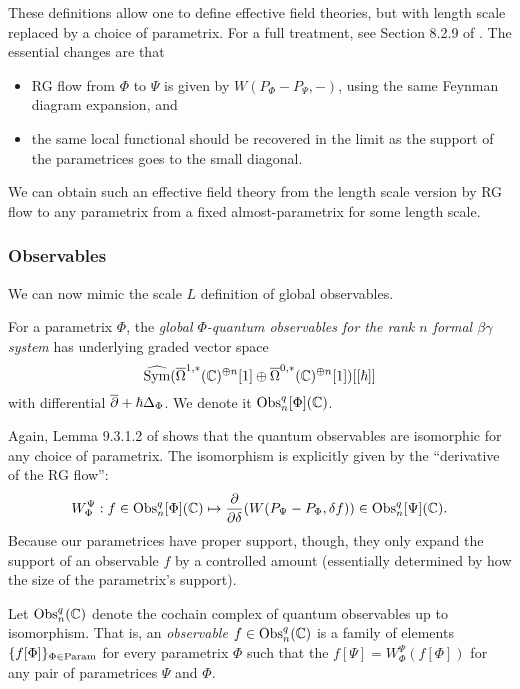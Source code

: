 These definitions allow one to define effective field theories, but with length scale replaced by a choice of parametrix.
For a full treatment, see Section 8.2.9 of \cite{CG}.
The essential changes are that 
\begin{itemize}
\item RG flow from $\Phi$ to $\Psi$ is given by $W(P_\Phi - P_\Psi,-)$, using the same Feynman diagram expansion, and
\item the same local functional should be recovered in the limit as the support of the parametrices goes to the small diagonal.
\end{itemize} 
We can obtain such an effective field theory from the length scale version 
by RG flow to any parametrix from a fixed almost-parametrix for some length scale.

\subsubsection{Observables}

We can now mimic the scale $L$ definition of global observables.

\begin{dfn}
For a parametrix $\Phi$, the  \emph{global $\Phi$-quantum observables for the rank $n$ formal $\beta\gamma$ system} has
underlying graded vector space
\[
\widehat{{\rm Sym}}(\overline{\Omega}^{1,*}(\mathbb C)^{\oplus n}[1] \oplus \overline{\Omega}^{0,*}(\mathbb C)^{\oplus n}[1])[[\hbar]]
\]
with differential $\overline{\partial} + \hbar \Delta_\Phi$. 
We denote it ${\rm Obs}^q_n[\Phi](\mathbb C)$.
\end{dfn}

Again, Lemma 9.3.1.2 of \cite{CG} shows that the quantum observables are isomorphic for any choice of parametrix.
The isomorphism is explicitly given by the ``derivative of the RG flow'':
\[
W_\Phi^\Psi: f \in {\rm Obs}^q_n[\Phi](\mathbb C) \mapsto \frac{\partial}{\partial \delta}(W(P_\Psi - P_\Phi, \delta f)) \in {\rm Obs}^q_n[\Psi](\mathbb C).
\]
Because our parametrices have proper support, though, they only expand the support of an observable $f$ by a controlled amount 
(essentially determined by how the size of the parametrix's support).

\begin{dfn}
Let ${\rm Obs}^q_n(\mathbb C)$ denote the cochain complex of quantum observables up to isomorphism.
That is, an \emph{observable} $f \in {\rm Obs}^q_n(\mathbb C)$ is a family of elements $\{f[\Phi]\}_{\Phi \in {\rm Param}}$ for every parametrix $\Phi$ 
such that the $f[\Psi] = W_\Phi^\Psi(f[\Phi])$ for any pair of parametrices $\Psi$ and $\Phi$.
\end{dfn}

